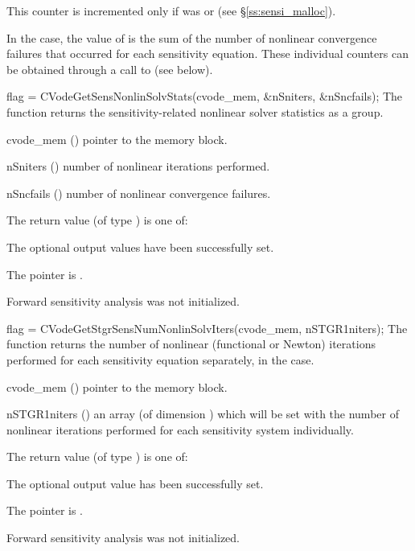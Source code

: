 {
  This counter is incremented only if  was  or 
   (see \S\ref{ss:sensi_malloc}).
  
  In the  case, the value of  is the sum of 
  the number of nonlinear convergence failures that occurred for each sensitivity equation.
  These individual counters can be obtained through a call to
   (see below).
}
{
  flag = CVodeGetSensNonlinSolvStats(cvode\_mem, \&nSniters, \&nSncfails);
}
{
  The function  returns the sensitivity-related
  nonlinear solver statistics as a group.
}
{
  \begin{args}
  \item[cvode\_mem] ()
    pointer to the {\cvodes} memory block.
  \item[nSniters] ()
    number of nonlinear iterations performed.
  \item[nSncfails] ()
    number of nonlinear convergence failures.
  \end{args}
}
{
  The return value  (of type ) is one of:
  \begin{args}
  \item[\Id{CV\_SUCCESS}] 
    The optional output values have been successfully set.
  \item[\Id{CV\_MEM\_NULL}]
    The  pointer is .
  \item[\Id{CV\_NO\_SENS}]
    Forward sensitivity analysis was not initialized.
  \end{args}
}
{}
{
  flag = CVodeGetStgrSensNumNonlinSolvIters(cvode\_mem, nSTGR1niters);
}
{
  The function  returns the
  number of nonlinear (functional or Newton) iterations performed for 
  each sensitivity equation separately, in the  case.
}
{
  \begin{args}
  \item[cvode\_mem] ()
    pointer to the {\cvodes} memory block.
  \item[nSTGR1niters] ()
    an array (of dimension ) which will be set with the number of 
    nonlinear iterations performed for each sensitivity system individually.
  \end{args}
}
{
  The return value  (of type ) is one of:
  \begin{args}
  \item[\Id{CV\_SUCCESS}] 
    The optional output value has been successfully set.
  \item[\Id{CV\_MEM\_NULL}]
    The  pointer is .
  \item[\Id{CV\_NO\_SENS}]
    Forward sensitivity analysis was not initialized.
  \end{args}
}
